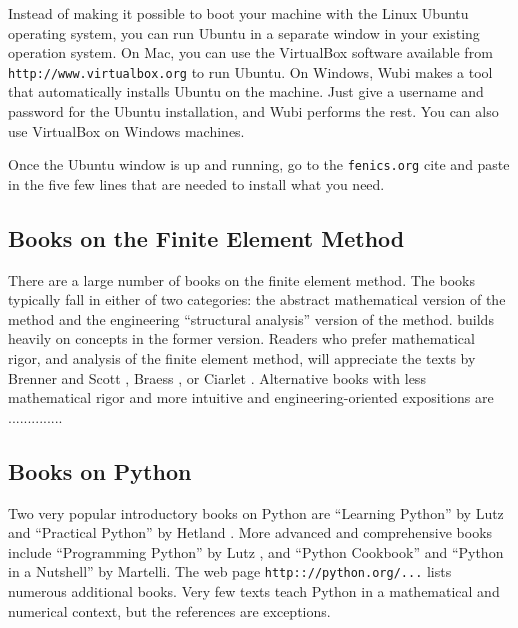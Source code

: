 Instead of making it possible to boot your machine with the Linux
Ubuntu operating system, you can run Ubuntu in a separate window in
your existing operation system. On Mac, you can use the VirtualBox
software available
from {\fontsize{12pt}{12pt}\texttt{http://www.virtualbox.org}} to run Ubuntu.  On Windows, Wubi
makes a tool that automatically installs Ubuntu on the machine. Just
give a username and password for the Ubuntu installation, and Wubi
performs the rest. You can also use VirtualBox on Windows machines.

Once the Ubuntu window
is up and running, go to the {\fontsize{12pt}{12pt}\texttt{fenics.org}} cite and paste in
the five few lines that are needed to install what you need.


\subsection{Books on the Finite Element Method}
\label{langtangen:appendix:books}
There are a large number of books on the finite element method.
The books typically fall in either of two categories: the abstract
mathematical version of the method and the engineering ``structural analysis''
version of the method. \fenics{} builds heavily on concepts in the former
version. Readers who prefer mathematical rigor, and analysis of the
finite element method, will appreciate the texts by
Brenner and Scott \cite{BrennerScott2008}, Braess \cite{Braess2007}, or
Ciarlet \cite{Ciarlet2002a}.
Alternative books with
less mathematical rigor and more intuitive and engineering-oriented
expositions are ..............


\subsection{Books on Python}
\label{langtangen:appendix:pybooks}

Two very popular introductory books on Python are
``Learning Python''  by Lutz \cite{LearningPython} and
``Practical Python''  by Hetland \cite{Hetland2002}.
More advanced and comprehensive books include
``Programming Python'' by Lutz \cite{LutzPython2006},
and ``Python Cookbook'' \cite{PythonCookbook} and ``Python in a Nutshell''
\cite{PyNutshell} by Martelli.
The web page {\fontsize{12pt}{12pt}\texttt{http:://python.org/...}} lists numerous additional
books.
Very few texts teach Python in a mathematical and numerical context,
but the references \cite{Langtangen2006,Langtangen2009b} are exceptions.



